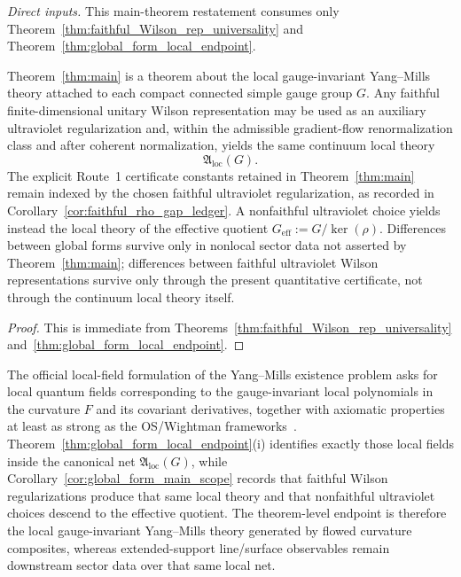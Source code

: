 \noindent\emph{Direct inputs.} This main-theorem restatement consumes only Theorem~\ref{thm:faithful_Wilson_rep_universality} and Theorem~\ref{thm:global_form_local_endpoint}.\par

\begin{corollary}
\label{cor:global_form_main_scope}
Theorem~\ref{thm:main} is a theorem about the local gauge-invariant Yang--Mills theory attached to each compact connected simple gauge group $G$.
Any faithful finite-dimensional unitary Wilson representation may be used as an auxiliary ultraviolet regularization and, within the admissible gradient-flow renormalization class and after coherent normalization, yields the same continuum local theory
\[
\mathfrak A_{\mathrm{loc}}(G).
\]
The explicit Route~1 certificate constants retained in Theorem~\ref{thm:main} remain indexed by the chosen faithful ultraviolet regularization, as recorded in Corollary~\ref{cor:faithful_rho_gap_ledger}.
A nonfaithful ultraviolet choice yields instead the local theory of the effective quotient $G_{\mathrm{eff}}:=G/\ker(\rho)$.
Differences between global forms survive only in nonlocal sector data not asserted by Theorem~\ref{thm:main}; differences between faithful ultraviolet Wilson representations survive only through the present quantitative certificate, not through the continuum local theory itself.
\end{corollary}

\begin{proof}
This is immediate from Theorems~\ref{thm:faithful_Wilson_rep_universality} and~\ref{thm:global_form_local_endpoint}.
\end{proof}

\begin{remark}
The official local-field formulation of the Yang--Mills existence problem asks for local quantum fields corresponding to the gauge-invariant local polynomials in the curvature $F$ and its covariant derivatives, together with axiomatic properties at least as strong as the OS/Wightman frameworks~\cite{JaffeWittenYM}.
Theorem~\ref{thm:global_form_local_endpoint}(i) identifies exactly those local fields inside the canonical net $\mathfrak A_{\mathrm{loc}}(G)$, while Corollary~\ref{cor:global_form_main_scope} records that faithful Wilson regularizations produce that same local theory and that nonfaithful ultraviolet choices descend to the effective quotient.
The theorem-level endpoint is therefore the local gauge-invariant Yang--Mills theory generated by flowed curvature composites, whereas extended-support line/surface observables remain downstream sector data over that same local net.
\end{remark}

